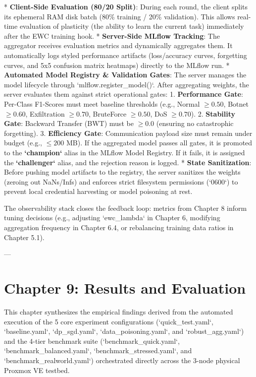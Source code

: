\documentclass[conference]{IEEEtran}
\begin{document}
* \textbf{Client-Side Evaluation (80/20 Split)}: During each round, the client splits its ephemeral RAM disk batch (80\% training / 20\% validation). This allows real-time evaluation of plasticity (the ability to learn the current task) immediately after the EWC training hook.
* \textbf{Server-Side MLflow Tracking}: The aggregator receives evaluation metrics and dynamically aggregates them. It automatically logs styled performance artifacts (loss/accuracy curves, forgetting curves, and 5x5 confusion matrix heatmaps) directly to the MLflow run.
* \textbf{Automated Model Registry \& Validation Gates}: The server manages the model lifecycle through `mlflow.register\_model()`. After aggregating weights, the server evaluates them against strict operational gates:
  1. \textbf{Performance Gate}: Per-Class F1-Scores must meet baseline thresholds (e.g., Normal $\ge 0.50$, Botnet $\ge 0.60$, Exfiltration $\ge 0.70$, BruteForce $\ge 0.50$, DoS $\ge 0.70$).
  2. \textbf{Stability Gate}: Backward Transfer (BWT) must be $\ge 0.0$ (ensuring no catastrophic forgetting).
  3. \textbf{Efficiency Gate}: Communication payload size must remain under budget (e.g., $\le 200$ MB).
  If the aggregated model passes all gates, it is promoted to the \textbf{`champion`} alias in the MLflow Model Registry. If it fails, it is assigned the \textbf{`challenger`} alias, and the rejection reason is logged.
* \textbf{State Sanitization}: Before pushing model artifacts to the registry, the server sanitizes the weights (zeroing out NaNs/Infs) and enforces strict filesystem permissions (`0600`) to prevent local credential harvesting or model poisoning at rest.

The observability stack closes the feedback loop: metrics from Chapter 8 inform tuning decisions (e.g., adjusting `ewc\_lambda` in Chapter 6, modifying aggregation frequency in Chapter 6.4, or rebalancing training data ratios in Chapter 5.1).

---


\section{Chapter 9: Results and Evaluation}

This chapter synthesizes the empirical findings derived from the automated execution of the 5 core experiment configurations (`quick\_test.yaml`, `baseline.yaml`, `dp\_sgd.yaml`, `data\_poisoning.yaml`, and `robust\_agg.yaml`) and the 4-tier benchmark suite (`benchmark\_quick.yaml`, `benchmark\_balanced.yaml`, `benchmark\_stressed.yaml`, and `benchmark\_realworld.yaml`) orchestrated directly across the 3-node physical Proxmox VE testbed.
\end{document}
